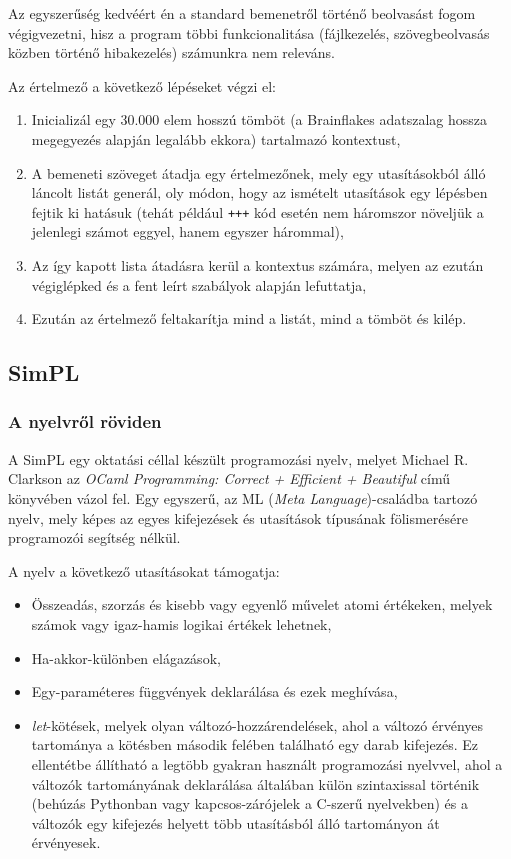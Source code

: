 Az egyszerűség kedvéért én a standard bemenetről történő beolvasást fogom végigvezetni, hisz a program többi funkcionalitása (fájlkezelés, szövegbeolvasás közben történő hibakezelés) számunkra nem releváns.

Az értelmező a következő lépéseket végzi el:

\begin{enumerate}
    \item Inicializál egy 30.000 elem hosszú tömböt (a Brainflakes adatszalag hossza megegyezés alapján legalább ekkora) tartalmazó kontextust,
    \item A bemeneti szöveget átadja egy értelmezőnek, mely egy utasításokból álló láncolt listát generál, oly módon, hogy az ismételt utasítások egy lépésben fejtik ki hatásuk (tehát például \texttt{+++} kód esetén nem háromszor növeljük a jelenlegi számot eggyel, hanem egyszer hárommal),
    \item Az így kapott lista átadásra kerül a kontextus számára, melyen az ezután végiglépked és a fent leírt szabályok alapján lefuttatja,
    \item Ezután az értelmező feltakarítja mind a listát, mind a tömböt és kilép.
\end{enumerate}

\subsection{SimPL}
\label{sec:simpl}

\subsubsection{A nyelvről röviden}

A SimPL egy oktatási céllal készült programozási nyelv, melyet Michael R. Clarkson az \textit{OCaml Programming: Correct + Efficient + Beautiful} című könyvében\cite{ocaml} vázol fel. Egy egyszerű, az ML (\textit{Meta Language})-családba tartozó nyelv, mely képes az egyes kifejezések és utasítások típusának fölismerésére programozói segítség nélkül.

A nyelv a következő utasításokat támogatja:

\begin{itemize}
    \item Összeadás, szorzás és kisebb vagy egyenlő művelet atomi értékeken, melyek számok vagy igaz-hamis logikai értékek lehetnek,
    \item Ha-akkor-különben elágazások,
    \item Egy-paraméteres függvények deklarálása és ezek meghívása, 
    \item \textit{let}-kötések, melyek olyan változó-hozzárendelések, ahol a változó érvényes tartománya a kötésben második felében található egy darab kifejezés. Ez ellentétbe állítható a legtöbb gyakran használt programozási nyelvvel, ahol a változók tartományának deklarálása általában külön szintaxissal történik (behúzás Pythonban vagy kapcsos-zárójelek a C-szerű nyelvekben) és a változók egy kifejezés helyett több utasításból álló tartományon át érvényesek.
\end{itemize}

